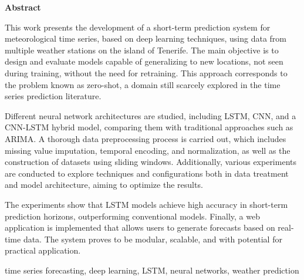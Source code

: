 \documentclass[spanish,a4paper,12pt,oneside]{extreport}
\newenvironment{summary}
{\par\noindent\begin{center}\textbf{Abstract}\end{center}\begin{itshape}\par\noindent}
{\end{itshape}}
\newenvironment{keywords}
{\begin{list}{}{\setlength{\leftmargin}{1em}}\item[\hskip\labelsep \bfseries Keywords:]}
{\end{list}}
\begin{document}
\begin{summary}
{
This work presents the development of a short-term prediction system for meteorological time series, based on deep learning techniques, using data from multiple weather stations on the island of Tenerife. The main objective is to design and evaluate models capable of generalizing to new locations, not seen during training, without the need for retraining. This approach corresponds to the problem known as zero-shot, a domain still scarcely explored in the time series prediction literature.

Different neural network architectures are studied, including LSTM, CNN, and a CNN-LSTM hybrid model, comparing them with traditional approaches such as ARIMA. A thorough data preprocessing process is carried out, which includes missing value imputation, temporal encoding, and normalization, as well as the construction of datasets using sliding windows. Additionally, various experiments are conducted to explore techniques and configurations both in data treatment and model architecture, aiming to optimize the results.

The experiments show that LSTM models achieve high accuracy in short-term prediction horizons, outperforming conventional models. Finally, a web application is implemented that allows users to generate forecasts based on real-time data. The system proves to be modular, scalable, and with potential for practical application.
}

\em
\begin {keywords}
time series forecasting, deep learning, LSTM, neural networks, weather prediction
\end {keywords}

\end{summary}
\newpage{\pagestyle{empty}}
\thispagestyle{empty}

\pagestyle{myheadings} %



\renewcommand{\thepage}{\roman{page}}
\setcounter{page}{1}
\pagestyle{plain} 
\end{document}
